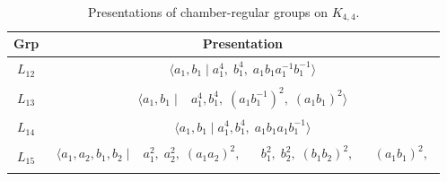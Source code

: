 \documentclass[dvipsnames]{article}
\theoremstyle{definition}
\theoremstyle{remark}
\begin{document}
    \begin{longtable}{ |c|c| }
    \caption{Presentations of chamber-regular groups on $K_{4,4}$.}
    \label{tbl:K44}\\
    \hline
    \textbf{Grp} & \textbf{Presentation} \\
    \hline
    $L_{12}$
    &
    \begin{minipage}{6cm}
        {
        \vspace{-2.5mm}
        \begin{align*}
            \big \langle
            a_1,b_1 \; \big | \;
            a_1^4, \;
            b_1^4, \;
            a_1 b_1 a_1^{-1} b_1^{-1}
            \big \rangle
        \end{align*}
        \vspace{-5mm}
        }
    \end{minipage}\\
    \hline
    $L_{13}$
    &
    \begin{minipage}{6cm}
        {
        \vspace{-2.5mm}
        \begin{align*}
            \big \langle
            a_1,b_1 \; \big | \; &
            a_1^4, b_1^4, \;
            (a_1 b_1^{-1})^2, \;
            (a_1b_1)^2
            \big \rangle
        \end{align*}
        \vspace{-5mm}
        }
    \end{minipage}\\
    \hline
    $L_{14}$
    &
    \begin{minipage}{6cm}
        {
        \vspace{-2.5mm}
        \begin{align*}
            \big \langle
            a_1,b_1 \; \big | \;
            a_1^4, b_1^4, \;
            a_1 b_1 a_1 b_1^{-1}
            \big \rangle
        \end{align*}
        \vspace{-5mm}
        }
    \end{minipage}\\
    \hline
    $L_{15}$
    &
    \begin{minipage}{6cm}
        {
        \vspace{-2.5mm}
        \begin{align*}
            \big \langle
            a_1, a_2, b_1, b_2 \; \big | \;&
            a_1^2, \; a_2^2, \; (a_1 a_2)^2, && b_1^2, \; b_2^2, \; (b_1 b_2)^2, && (a_1 b_1)^2,\\

\end{align*}}
\end{minipage}
\end{longtable}
\end{document}
